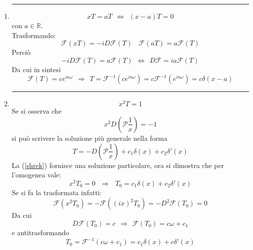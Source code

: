\documentclass[twoside]{article}
\begin{document}
\begin{enumerate}
    \item
    \rule{\textwidth}{.7 pt}
    \begin{equation}
        xT=aT \ \ \iff \ \ (x-a)T=0
    \end{equation}
    con $a \in \mathds{R}$.
    \\
    Trasformando:
    \begin{equation}
        \mathcal{F}(xT)=-iD\mathcal{F}(T) \ \ \ \ \mathcal{F}(aT)=a\mathcal{F}(T)
    \end{equation}
    Perciò
    \begin{equation}
        -iD\mathcal{F}(T)=a\mathcal{F}(T) \ \ \iff \ \ D\mathcal{F}=ia\mathcal{F}(T)
    \end{equation}
    Da cui in sintesi
    \begin{equation}
        \mathcal{F}(T)=ce^{ia\omega} \ \ \Rightarrow \ \ T=\mathcal{F}^{-1}(ce^{ia\omega})=c\mathcal{F}^{-1}(e^{ia\omega})=c\delta(x-a)
    \end{equation}
    \item
    \rule{\textwidth}{.7 pt}
    \begin{equation}
        x^2T=1
    \end{equation}
    Se si osserva che 
    \begin{equation}\label{shrek}
        x^2D\left( \mathscr{P}\frac{1}{x} \right)=-1
    \end{equation}
    si può scrivere la soluzione più generale nella forma
    \begin{equation}
        T=-D\left( \mathscr{P}\frac{1}{x} \right)+c_1\delta(x)+c_2\delta'(x)
    \end{equation}
    La (\ref{shrek}) fornisce una soluzione particolare, ora si dimostra che per l'omogenea vale:
    \begin{equation}
        x^2T_0=0 \ \ \ \Rightarrow \ \ \ T_0=c_1\delta(x)+c_2\delta'(x)
    \end{equation}
    Se si fa la trasformata infatti:
    \begin{equation}
        \mathcal{F}(x^2T_0)=-\mathcal{F}((ix)^2T_0)=-D^2\mathcal{F}(T_0)=0
    \end{equation}
    Da cui
    \begin{equation}
        D\mathcal{F}(T_0)=c \ \ \Rightarrow \ \ \mathcal{F}(T_0)=c\omega + c_1
    \end{equation}
    e antitrasformando
    \begin{equation}
        T_0=\mathcal{F}^{-1}(c\omega + c_1)=c_1 \delta(x) + c \delta'(x)
    \end{equation}
    
    
    
\end{enumerate}
\end{document}
